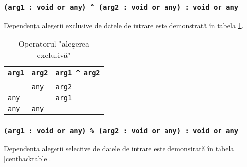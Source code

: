 \subsubsection{\texttt{(arg1 : void or any) ^ (arg2 : void or any) : void or any}}

Dependența alegerii exclusive de datele de intrare este demonstrată în tabela \ref{xorhacktable}.

\begin{table}[htb]
	\caption{Operatorul "alegerea exclusivă"}
	\label{xorhacktable}
	\begin{tabular}{|l|l|l|}
		\hline
		\texttt{arg1} & \texttt{arg2} & \texttt{arg1 ^ arg2} \\ \hline
		\void{}     & \void{}     & \void{}   			\\ \hline
		\void{}     & \texttt{any}  & \texttt{arg2}   		\\ \hline
		\texttt{any}  & \void{}     & \texttt{arg1}   		\\ \hline
		\texttt{any}  & \texttt{any}  & \void{}   			\\ \hline
	\end{tabular}
	\vspace{0em}
\end{table}

\subsubsection{\texttt{(arg1 : void or any) \% (arg2 : void or any) : void or any}}

Dependența alegerii selective de datele de intrare este demonstrată în tabela \ref{centhacktable}.

